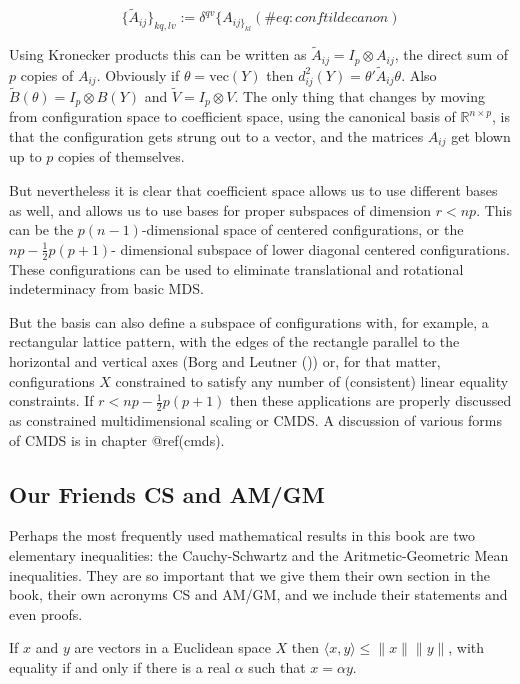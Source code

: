 \documentclass[
  12pt,
  letterpaper,
  DIV=11,
  numbers=noendperiod]{scrreprt}
\theoremstyle{remark}
\begin{document}
\begin{equation}
\{\tilde A_{ij}\}_{kq,lv}:=
\delta^{qv}\{A_{ij\}_{kl}}
(\#eq:conftildecanon)
\end{equation}

Using Kronecker products this can be written as
\(\tilde A_{ij}=I_p\otimes A_{ij}\), the direct sum of \(p\) copies of
\(A_{ij}\). Obviously if \(\theta=\text{vec}(Y)\) then
\(d_{ij}^2(Y)=\theta'\tilde A_{ij}\theta\). Also
\(\tilde B(\theta)=I_p\otimes B(Y)\) and \(\tilde V=I_p\otimes V\). The
only thing that changes by moving from configuration space to
coefficient space, using the canonical basis of
\(\mathbb{R}^{n\times p}\), is that the configuration gets strung out to
a vector, and the matrices \(A_{ij}\) get blown up to \(p\) copies of
themselves.

But nevertheless it is clear that coefficient space allows us to use
different bases as well, and allows us to use bases for proper subspaces
of dimension \(r<np\). This can be the \(p(n-1)\)-dimensional space of
centered configurations, or the \(np-\frac12p(p+1)\)- dimensional
subspace of lower diagonal centered configurations. These configurations
can be used to eliminate translational and rotational indeterminacy from
basic MDS.

But the basis can also define a subspace of configurations with, for
example, a rectangular lattice pattern, with the edges of the rectangle
parallel to the horizontal and vertical axes (Borg and Leutner
()) or, for that matter,
configurations \(X\) constrained to satisfy any number of (consistent)
linear equality constraints. If \(r<np-\frac12p(p+1)\) then these
applications are properly discussed as constrained multidimensional
scaling or CMDS. A discussion of various forms of CMDS is in chapter
@ref(cmds).

\subsection{Our Friends CS and AM/GM}\label{our-friends-cs-and-amgm}

Perhaps the most frequently used mathematical results in this book are
two elementary inequalities: the Cauchy-Schwartz and the
Aritmetic-Geometric Mean inequalities. They are so important that we
give them their own section in the book, their own acronyms CS and
AM/GM, and we include their statements and even proofs.

\label{csineq}
If \(x\) and \(y\) are vectors in a Euclidean space \(X\) then
\(\langle x,y\rangle\leq\|x\|\|y\|\), with equality if and only if there
is a real \(\alpha\) such that \(x=\alpha y\).
\end{document}
